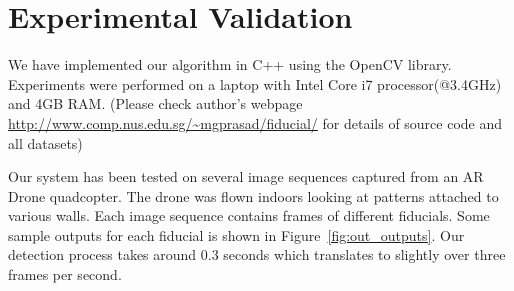 \documentclass[10pt,twocolumn,letterpaper]{article}
\begin{document}

\section{Experimental Validation}

We have implemented our algorithm in C++ using the OpenCV library.
Experiments were performed on a laptop with Intel Core i7
processor(@3.4GHz) and 4GB RAM. (Please check author's webpage
\url{http://www.comp.nus.edu.sg/~mgprasad/fiducial/} for details of source code
and all datasets)

Our system has been tested on several image sequences captured from an
AR Drone quadcopter.  The drone was flown indoors looking at patterns
attached to various walls. Each image sequence contains frames of
different fiducials. Some sample outputs for each fiducial
is shown in Figure~\ref{fig:out_outputs}. Our detection process takes
around 0.3 seconds which translates to slightly over three frames per
second.
\end{document}
